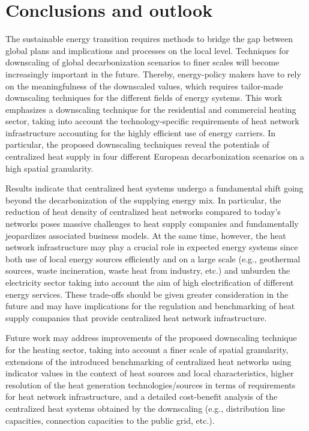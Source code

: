 \section{Conclusions and outlook}\label{conclusions}
The sustainable energy transition requires methods to bridge the gap between global plans and implications and processes on the local level. Techniques for downscaling of global decarbonization scenarios to finer scales will become increasingly important in the future. Thereby, energy-policy makers have to rely on the meaningfulness of the downscaled values, which requires tailor-made downscaling techniques for the different fields of energy systems. This work emphasizes a downscaling technique for the residential and commercial heating sector, taking into account the technology-specific requirements of heat network infrastructure accounting for the highly efficient use of energy carriers. In particular, the proposed downscaling techniques reveal the potentials of centralized heat supply in four different European decarbonization scenarios on a high spatial granularity.\newline

Results indicate that centralized heat systems undergo a fundamental shift going beyond the decarbonization of the supplying energy mix. In particular, the reduction of heat density of centralized heat networks compared to today's networks poses massive challenges to heat supply companies and fundamentally jeopardizes associated business models. At the same time, however, the heat network infrastructure may play a crucial role in expected energy systems since both use of local energy sources efficiently and on a large scale (e.g., geothermal sources, waste incineration, waste heat from industry, etc.) and unburden the electricity sector taking into account the aim of high electrification of different energy services. These trade-offs should be given greater consideration in the future and may have implications for the regulation and benchmarking of heat supply companies that provide centralized heat network infrastructure.\newline

Future work may address improvements of the proposed downscaling technique for the heating sector, taking into account a finer scale of spatial granularity, extensions of the introduced benchmarking of centralized heat networks using indicator values in the context of heat sources and local characteristics, higher resolution of the heat generation technologies/sources in terms of requirements for heat network infrastructure, and a detailed cost-benefit analysis of the centralized heat systems obtained by the downscaling (e.g., distribution line capacities, connection capacities to the public grid, etc.). 



